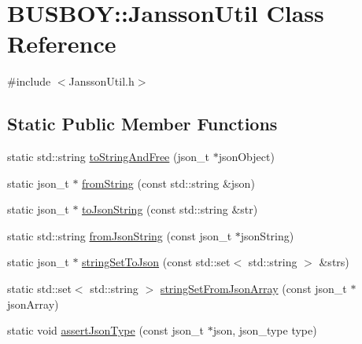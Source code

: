 \hypertarget{classBUSBOY_1_1JanssonUtil}{
\section{BUSBOY::JanssonUtil Class Reference}
\label{classBUSBOY_1_1JanssonUtil}
}


{\ttfamily \#include $<$JanssonUtil.h$>$}\subsection*{Static Public Member Functions}
\begin{DoxyCompactItemize}
\item 
static std::string \hyperlink{classBUSBOY_1_1JanssonUtil_aa2a5ec966cd37435128658373c837ef7}{toStringAndFree} (json\_\-t $\ast$jsonObject)
\item 
static json\_\-t $\ast$ \hyperlink{classBUSBOY_1_1JanssonUtil_ae61a00d95d55c40407b81ea7ecb9a2ff}{fromString} (const std::string \&json)
\item 
static json\_\-t $\ast$ \hyperlink{classBUSBOY_1_1JanssonUtil_a8846f73c10483cc2dfc08e9e6a8bc761}{toJsonString} (const std::string \&str)
\item 
static std::string \hyperlink{classBUSBOY_1_1JanssonUtil_ac61371356aed094549ebb26d3a30bb26}{fromJsonString} (const json\_\-t $\ast$jsonString)
\item 
static json\_\-t $\ast$ \hyperlink{classBUSBOY_1_1JanssonUtil_a9d1444718edc427fbfbf94a3357d46f1}{stringSetToJson} (const std::set$<$ std::string $>$ \&strs)
\item 
static std::set$<$ std::string $>$ \hyperlink{classBUSBOY_1_1JanssonUtil_aa5d1804e4c6802073d447aebece437a0}{stringSetFromJsonArray} (const json\_\-t $\ast$jsonArray)
\item 
static void \hyperlink{classBUSBOY_1_1JanssonUtil_a9bcfb0e2a1a5a2a8fc49e9ec31e0f27f}{assertJsonType} (const json\_\-t $\ast$json, json\_\-type type)
\end{DoxyCompactItemize}


